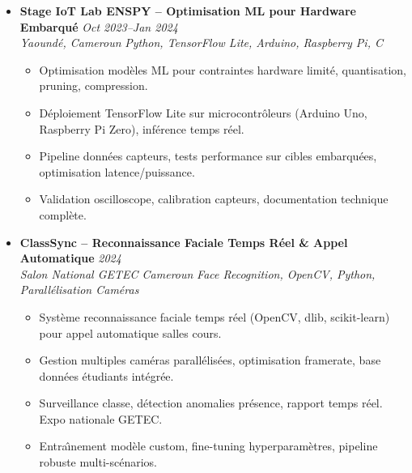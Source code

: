 \documentclass[a4paper,11pt]{article}
\begin{document}
\begin{itemize}[leftmargin=*, label={-}]
\begin{itemize}[leftmargin=0.4cm, nosep, label=\tiny$\bullet$]
            \item \small{D\'eploiement prototype pour applications m\'edicales temps r\'eel, contraintes inf\'erence sur hardware mobiles.}
        \end{itemize}
    \vspace{3pt}
    \item \textbf{Stage IoT Lab ENSPY -- Optimisation ML pour Hardware Embarqu\'e} \hfill \textit{Oct 2023--Jan 2024} \\
    \textit{Yaound\'e, Cameroun} \hfill \textit{Python, TensorFlow Lite, Arduino, Raspberry Pi, C}
    \vspace{-2pt}
        \begin{itemize}[leftmargin=0.4cm, nosep, label=\tiny$\bullet$]
            \item \small{Optimisation mod\`eles ML pour contraintes hardware limit\'e, quantisation, pruning, compression.}
            \item \small{D\'eploiement TensorFlow Lite sur microcontr\^oleurs (Arduino Uno, Raspberry Pi Zero), inf\'erence temps r\'eel.}
            \item \small{Pipeline donn\'ees capteurs, tests performance sur cibles embarqu\'ees, optimisation latence/puissance.}
            \item \small{Validation oscilloscope, calibration capteurs, documentation technique compl\`ete.}
        \end{itemize}
    \vspace{3pt}
    \item \textbf{ClassSync -- Reconnaissance Faciale Temps R\'eel \& Appel Automatique} \hfill \textit{2024} \\
    \textit{Salon National GETEC Cameroun} \hfill \textit{Face Recognition, OpenCV, Python, Parall\'elisation Cam\'eras}
    \vspace{-2pt}
        \begin{itemize}[leftmargin=0.4cm, nosep, label=\tiny$\bullet$]
            \item \small{Syst\`eme reconnaissance faciale temps r\'eel (OpenCV, dlib, scikit-learn) pour appel automatique salles cours.}
            \item \small{Gestion multiples cam\'eras parall\'elis\'ees, optimisation framerate, base donn\'ees \'etudiants int\'egr\'ee.}
            \item \small{Surveillance classe, d\'etection anomalies pr\'esence, rapport temps r\'eel. Expo nationale GETEC.}
            \item \small{Entra\^{\i}nement mod\`ele custom, fine-tuning hyperparam\`etres, pipeline robuste multi-sc\'enarios.}

\end{itemize}
\end{itemize}
\end{document}
